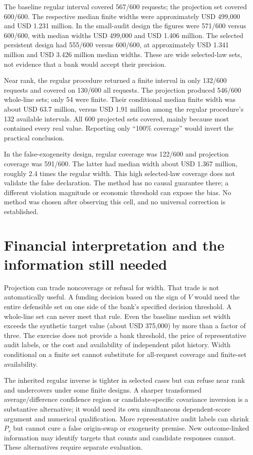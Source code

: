 The baseline regular interval covered 567/600 requests; the projection set
covered 600/600. The respective median finite widths were approximately
USD 499,000 and USD 1.231 million. In the small-audit design the figures were
571/600 versus 600/600, with median widths USD 499,000 and USD 1.406 million.
The selected persistent design had 555/600 versus 600/600, at approximately
USD 1.341 million and USD 3.426 million median widths. These are wide
selected-law sets, not evidence that a bank would accept their precision.

Near rank, the regular procedure returned a finite interval in only 132/600
requests and covered on 130/600 all requests. The projection produced 546/600
whole-line sets; only 54 were finite. Their conditional median finite width
was about USD 63.7 million, versus USD 1.91 million among the regular
procedure's 132 available intervals. All 600 projected sets covered, mainly
because most contained every real value. Reporting only ``100\% coverage''
would invert the practical conclusion.

In the false-exogeneity design, regular coverage was 122/600 and projection
coverage was 591/600. The latter had median width about USD 1.367 million,
roughly 2.4 times the regular width. This high selected-law coverage does not
validate the false declaration. The method has no causal guarantee there;
a different violation magnitude or economic threshold can expose the bias.
No method was chosen after observing this cell, and no universal correction
is established.

\section{Financial interpretation and the information still needed}

Projection can trade noncoverage or refusal for width. That trade is not
automatically useful. A funding decision based on the sign of $V$ would need
the entire defensible set on one side of the bank's specified decision
threshold. A whole-line set can never meet that rule. Even the baseline median
set width exceeds the synthetic target value (about USD 375,000) by more than
a factor of three. The exercise does not provide a bank threshold, the price
of representative audit labels, or the cost and availability of independent
pilot history. Width conditional on a finite set cannot substitute for
all-request coverage and finite-set availability.

The inherited regular inverse is tighter in selected cases but can refuse
near rank and undercovers under some finite designs. A sharper transformed
average/difference confidence region or candidate-specific covariance
inversion is a substantive alternative; it would need its own simultaneous
dependent-score argument and numerical qualification. More representative
audit labels can shrink $P_s$ but cannot cure a false origin-swap or
exogeneity premise. New outcome-linked information may identify targets that
counts and candidate responses cannot. These alternatives require separate evaluation.

